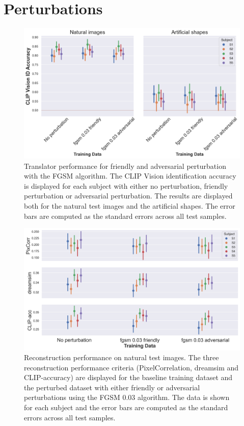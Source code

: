 \section{Perturbations}
\begin{figure}[H]
    \centering
    \includegraphics[width=1\textwidth]{plots/advpert_translator_fgsm_0.03.png}
    \caption[Experiment 3: Translator performance with FGSM]{Translator performance for friendly and adversarial perturbation with the FGSM algorithm. The CLIP Vision identification accuracy is displayed for each subject with either no perturbation, friendly perturbation or adversarial perturbation. The results are displayed both for the natural test images and the artificial shapes. The error bars are computed as the standard errors across all test samples.}\label{fig:advpert_translator_fgsm_0}
\end{figure}

\begin{figure}[H]
    \centering
    \includegraphics[width=1\textwidth]{plots/advpert_reconstruction_test_fgsm_0.03.png}
    \caption[Experiment 3: Reconstruction performance on natural test images with FGSM]{Reconstruction performance on natural test images. The three reconstruction performance criteria (PixelCorrelation, dreamsim and CLIP-accuracy) are displayed for the baseline training dataset and the perturbed dataset with either friendly or adversarial perturbations using the FGSM 0.03 algorithm. The data is shown for each subject and the error bars are computed as the standard errors across all test samples.}\label{fig:advpert_reconstruction_test_fgsm_0.03}
\end{figure}

